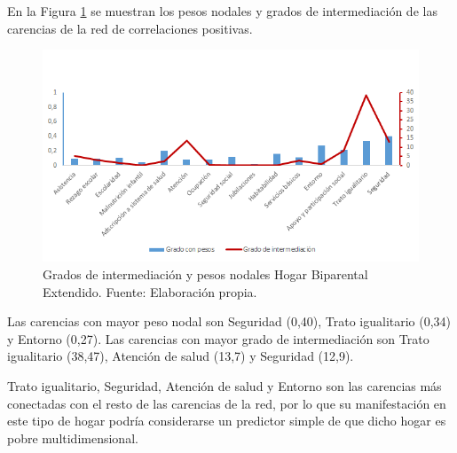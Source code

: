 \documentclass[12pt,letterpaper,spanish]{article}
\begin{document}
En la Figura \ref{CenBiex} se muestran los pesos nodales y grados de intermediación de las carencias de la red de correlaciones positivas.

\begin{figure}[H]
    \centering
    \includegraphics[width=\textwidth]{Grafos/nc_biex.png}
    \caption{Grados de intermediación y pesos nodales Hogar Biparental Extendido. Fuente: Elaboración propia.}
    \label{CenBiex}
\end{figure}
Las carencias con mayor peso nodal son Seguridad (0,40), Trato igualitario (0,34) y Entorno (0,27). Las carencias con mayor grado de intermediación son Trato igualitario (38,47), Atención de salud (13,7) y Seguridad (12,9).

Trato igualitario, Seguridad, Atención de salud y Entorno son las carencias más conectadas con el resto de las carencias de la red, por lo que su manifestación en este tipo de hogar podría considerarse un predictor simple de que dicho hogar es pobre multidimensional. 
\end{document}
